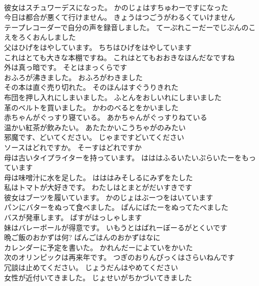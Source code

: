 \documentclass[8pt]{extreport}
\begin{document}
\begin{CJK}{UTF8}{min}
\\	彼女はスチュワーデスになった。	かのじょはすちゅわーですになった 
\\	今日は都合が悪くて行けません。	きょうはつごうがわるくていけません 
\\	テープレコーダーで自分の声を録音しました。	てーぷれこーだーでじぶんのこえをろくおんしました 
\\	父はひげをはやしています。	ちちはひげをはやしています 
\\	これはとても大きな本棚ですね。	これはとてもおおきなほんだなですね 
\\	外は真っ暗です。	そとはまっくらです 
\\	おふろが沸きました。	おふろがわきました 
\\	その本は直ぐ売り切れた。	そのほんはすぐうりきれた 
\\	布団を押し入れにしまいました。	ふとんをおしいれにしまいました 
\\	革のベルトを買いました。	かわのべるとをかいました 
\\	赤ちゃんがぐっすり寝ている。	あかちゃんがぐっすりねている 
\\	温かい紅茶が飲みたい。	あたたかいこうちゃがのみたい 
\\	邪魔です、どいてください。	じゃまですどいてください 
\\	ソースはどれですか。	そーすはどれですか 
\\	母は古いタイプライターを持っています。	はははふるいたいぷらいたーをもっています 
\\	母は味噌汁に水を足した。	はははみそしるにみずをたした 
\\	私はトマトが大好きです。	わたしはとまとがだいすきです 
\\	彼女はブーツを履いています。	かのじょはぶーつをはいています 
\\	パンにバターをぬって食べました。	ぱんにばたーをぬってたべました 
\\	バスが発車します。	ばすがはっしゃします 
\\	妹はバレーボールが得意です。	いもうとはばれーぼーるがとくいです 
\\	晩ご飯のおかずは何?	ばんごはんのおかずはなに 
\\	カレンダーに予定を書いた。	かれんだーによていをかいた 
\\	次のオリンピックは再来年です。	つぎのおりんぴっくはさらいねんです 
\\	冗談は止めてください。	じょうだんはやめてください 
\\	女性が近付いてきました。	じょせいがちかづいてきました 

\end{CJK}
\end{document}
